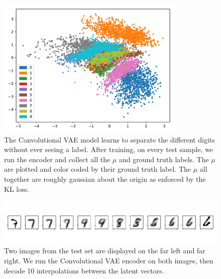 \documentclass[11pt]{article}
\begin{document}
\begin{figure}
  \centering
  \includegraphics[width=9cm]{imgs/convvae_mus2}
  \caption{The Convolutional VAE model learns to separate the different digits without ever seeing a label. After training, on every test sample, we run the encoder and collect all the $\mu$ and ground truth labels. The $\mu$ are plotted and color coded by their ground truth label. The $\mu$ all together are roughly gaussian about the origin as enforced by the KL loss.}
  \label{fig:convvaespace}
\end{figure}

\begin{figure}
  \centering
  \includegraphics[width=15cm]{imgs/convinterp_vae1}
  \caption{\label{fig:convgrid} Two images from the test set are displayed on the far left and far right. We run the Convolutional VAE encoder on both images, then decode 10 interpolations between the latent vectors.}
\end{figure}
\end{document}
